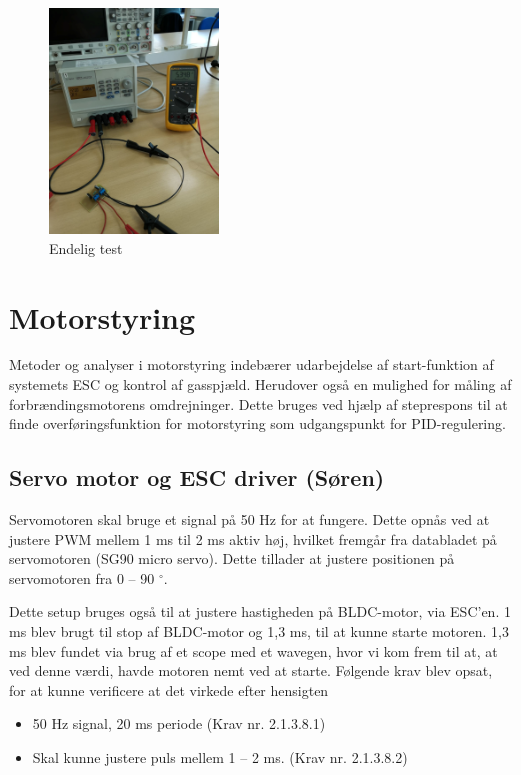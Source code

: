 \begin{figure}[h]
  \centering
  \includegraphics[width=0.4\textwidth]{./figurer/j12.png}
  \caption{Endelig test}
  \label{fig:j12}
\end{figure}

\clearpage
\section{Motorstyring}
\label{sec:motorstyring-1}

Metoder og analyser i motorstyring indebærer udarbejdelse af start-funktion af systemets ESC og kontrol af gasspjæld. Herudover også en mulighed for måling af forbrændingsmotorens omdrejninger. Dette bruges ved hjælp af steprespons til at finde overføringsfunktion for motorstyring som udgangspunkt for PID-regulering.

\subsection{Servo motor og ESC driver (Søren)}
\label{sec:servo-motor-og}

Servomotoren skal bruge et signal på 50 Hz for at fungere. Dette opnås ved at justere PWM mellem 1 ms til 2 ms aktiv høj, hvilket fremgår fra databladet på servomotoren (SG90 micro servo). Dette tillader at justere positionen på servomotoren fra 0 – 90 $^\circ$.

Dette setup bruges også til at justere hastigheden på BLDC-motor, via ESC'en. 1 ms blev brugt til stop af BLDC-motor og 1,3 ms, til at kunne starte motoren. 1,3 ms blev fundet via brug af et scope med et wavegen, hvor vi kom frem til at, at ved denne værdi, havde motoren nemt ved at starte. Følgende krav blev opsat, for at kunne verificere at det virkede efter hensigten

\begin{itemize}
\item 50 Hz signal, 20 ms periode (Krav nr. 2.1.3.8.1)
\item Skal kunne justere puls mellem 1 – 2 ms. (Krav nr. 2.1.3.8.2)
\end{itemize}

